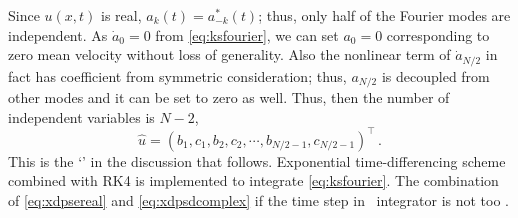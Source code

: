 \documentclass[final,leqno,onefignum,onetabnum]{siamltexmm}
\begin{document}
Since $u(x,t)$ is real, $a_{k}(t)=a^{*}_{-k}(t)$; thus, only half of the
Fourier modes are independent. As $\dot{a}_{0}=0$ from
\eqref{eq:ksfourier}, we can set $a_{0}=0$ corresponding to
zero mean velocity without loss of generality.
Also the nonlinear term
of $\dot{a}_{N/2}$ in fact has coefficient
from symmetric consideration;
thus, $a_{N/2}$ is decoupled from other modes and it
can be set to zero as well. Thus, then the number of independent variables
is $N-2$,
\begin{equation}
\label{eq:fourierspace}
\hat{u}=(b_{1},c_{1},b_{2},c_{2},\cdots,b_{N/2-1},c_{N/2-1})^\top
\,.
\end{equation}
This is the `\statesp' in the discussion that follows. Exponential time-differencing
scheme combined with RK4
is implemented to integrate
\eqref{eq:ksfourier}. The combination of 
\eqref{eq:xdpsereal} and \eqref{eq:xdpsdcomplex} if the
time step in \KS\ integrator is not too .
\end{document}
